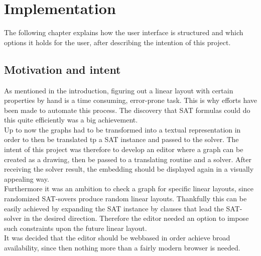 
\chapter{Implementation}
  \label{Implementation}
The following chapter explains how the user interface is structured and which options it holds for the user, after describing the intention of this project.
\section{Motivation and intent}
As mentioned in the introduction, figuring out a linear layout with certain properties by hand is a time consuming, error-prone task. This is why efforts have been made to automate this process. The discovery that SAT formulas could do this quite efficiently \cite{Bekos2015TheBE} was a big achievement.\\
Up to now the graphs had to be transformed into a textual representation in order to then be translated tp a SAT instance and passed to the solver. The intent of this project was therefore to develop an editor where a graph can be created as a drawing, then be passed to a translating routine and a solver. After receiving the solver result, the embedding should be displayed again in a visually appealing way.\\
Furthermore it was an ambition to check a graph for specific linear layouts, since randomized SAT-sovers produce random linear layouts. Thankfully this can be easily achieved by expanding the SAT instance by clauses that lead the SAT-solver in the desired direction. Therefore the editor needed an option to impose such constraints upon the future linear layout.\\
It was decided that the editor should be webbased in order achieve broad availability, since then nothing more than a fairly modern browser is needed.\\
